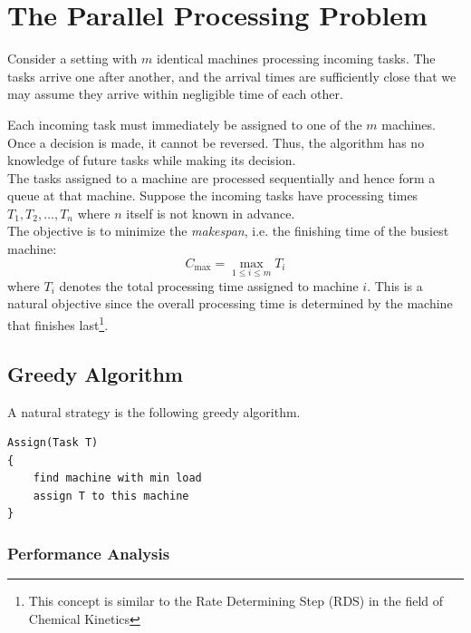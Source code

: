 \documentclass[11pt,openany]{book}
\begin{document}
\vspace{1em}
\section{The Parallel Processing Problem}

Consider a setting with $m$ identical machines processing incoming tasks. The tasks arrive 
one after another, and the arrival times are sufficiently close that 
we may assume they arrive within negligible time of each other.

Each incoming task must immediately be assigned to one of the $m$ machines. Once a decision is made, 
it cannot be reversed. Thus, the algorithm has no knowledge of future tasks while making its decision.\\

\noindent The tasks assigned to a machine are processed sequentially and hence form a queue at that machine.
Suppose the incoming tasks have processing times $T_1,T_2,\dots,T_n$ where $n$ itself is not known in advance.\\


\noindent The objective is to minimize the \textit{makespan}, i.e. the finishing time of the busiest machine:
\[
C_{\max}=\max_{1\le i\le m} T_i
\]
where $T_i$ denotes the total processing time assigned to machine $i$. 
This is a natural objective since the overall processing time
 is determined by the machine that finishes last\footnote{This 
 concept is similar to the Rate Determining Step (RDS) in the field of Chemical Kinetics}.

\subsection{Greedy Algorithm}

A natural strategy is the following greedy algorithm.
\begin{center}
\begin{minipage}{0.9\linewidth}
\begin{framed}
\begin{Verbatim}
Assign(Task T)
{
	find machine with min load
	assign T to this machine
}
\end{Verbatim}
\vspace{-4mm}
\end{framed}
\end{minipage}
\end{center}

\subsubsection*{Performance Analysis}
\end{document}
